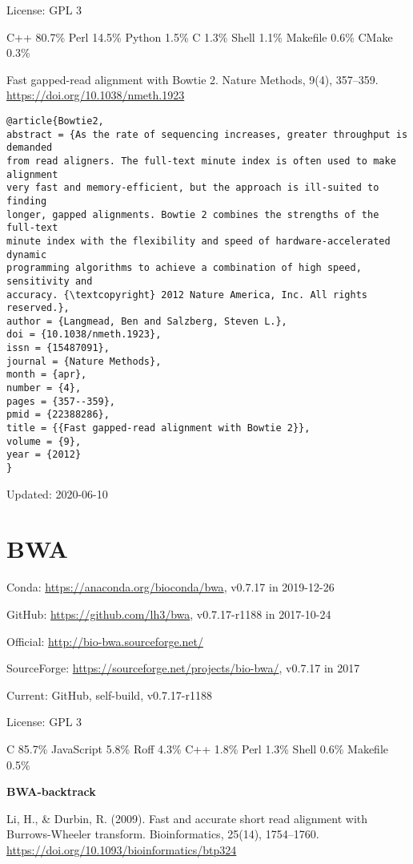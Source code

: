 \documentclass[]{article}
\begin{document}
License: GPL 3

C++ 80.7\% Perl 14.5\% Python 1.5\% C 1.3\% Shell 1.1\% Makefile 0.6\% CMake 0.3\%

Fast gapped-read alignment with Bowtie 2. Nature Methods, 9(4), 357–359. \url{https://doi.org/10.1038/nmeth.1923}

\begin{verbatim}
@article{Bowtie2,
abstract = {As the rate of sequencing increases, greater throughput is demanded
from read aligners. The full-text minute index is often used to make alignment
very fast and memory-efficient, but the approach is ill-suited to finding
longer, gapped alignments. Bowtie 2 combines the strengths of the full-text
minute index with the flexibility and speed of hardware-accelerated dynamic
programming algorithms to achieve a combination of high speed, sensitivity and
accuracy. {\textcopyright} 2012 Nature America, Inc. All rights reserved.},
author = {Langmead, Ben and Salzberg, Steven L.},
doi = {10.1038/nmeth.1923},
issn = {15487091},
journal = {Nature Methods},
month = {apr},
number = {4},
pages = {357--359},
pmid = {22388286},
title = {{Fast gapped-read alignment with Bowtie 2}},
volume = {9},
year = {2012}
}
\end{verbatim}

Updated: 2020-06-10


\section{BWA}

Conda: \url{https://anaconda.org/bioconda/bwa}, v0.7.17 in 2019-12-26

GitHub: \url{https://github.com/lh3/bwa}, v0.7.17-r1188 in 2017-10-24

Official: \url{http://bio-bwa.sourceforge.net/}

SourceForge: \url{https://sourceforge.net/projects/bio-bwa/}, v0.7.17 in 2017

Current: GitHub, self-build, v0.7.17-r1188

License: GPL 3

C 85.7\% JavaScript 5.8\% Roff 4.3\% C++ 1.8\% Perl 1.3\% Shell 0.6\% Makefile 0.5\%

\textbf{BWA-backtrack}

Li, H., \& Durbin, R. (2009). Fast and accurate short read alignment with Burrows-Wheeler transform. Bioinformatics, 25(14), 1754–1760. \url{https://doi.org/10.1093/bioinformatics/btp324}
\end{document}
